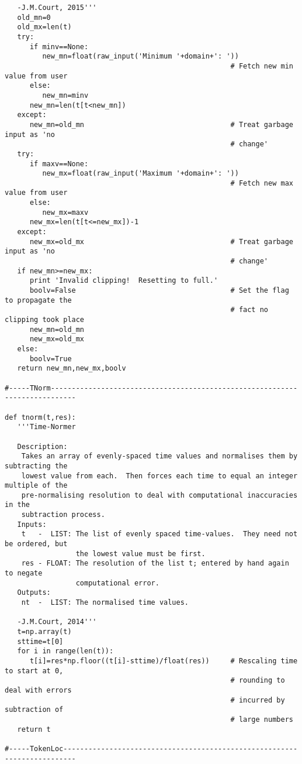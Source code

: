 \begin{verbatim}
   -J.M.Court, 2015'''
   old_mn=0
   old_mx=len(t)
   try:
      if minv==None:
         new_mn=float(raw_input('Minimum '+domain+': '))
                                                      # Fetch new min value from user
      else:
         new_mn=minv
      new_mn=len(t[t<new_mn]) 
   except:
      new_mn=old_mn                                   # Treat garbage input as 'no
                                                      # change'
   try:
      if maxv==None:
         new_mx=float(raw_input('Maximum '+domain+': '))
                                                      # Fetch new max value from user
      else:
         new_mx=maxv
      new_mx=len(t[t<=new_mx])-1      
   except:
      new_mx=old_mx                                   # Treat garbage input as 'no
                                                      # change'
   if new_mn>=new_mx:
      print 'Invalid clipping!  Resetting to full.'
      boolv=False                                     # Set the flag to propagate the 
                                                      # fact no clipping took place
      new_mn=old_mn
      new_mx=old_mx
   else:
      boolv=True
   return new_mn,new_mx,boolv

#-----TNorm----------------------------------------------------------------------------

def tnorm(t,res):
   '''Time-Normer

   Description:
    Takes an array of evenly-spaced time values and normalises them by subtracting the
    lowest value from each.  Then forces each time to equal an integer multiple of the
    pre-normalising resolution to deal with computational inaccuracies in the
    subtraction process.
   Inputs:
    t   -  LIST: The list of evenly spaced time-values.  They need not be ordered, but
                 the lowest value must be first.
    res - FLOAT: The resolution of the list t; entered by hand again to negate
                 computational error.
   Outputs:
    nt  -  LIST: The normalised time values.

   -J.M.Court, 2014'''
   t=np.array(t)
   sttime=t[0]
   for i in range(len(t)):
      t[i]=res*np.floor((t[i]-sttime)/float(res))     # Rescaling time to start at 0, 
                                                      # rounding to deal with errors
                                                      # incurred by subtraction of
                                                      # large numbers
   return t

#-----TokenLoc-------------------------------------------------------------------------


\end{verbatim}
